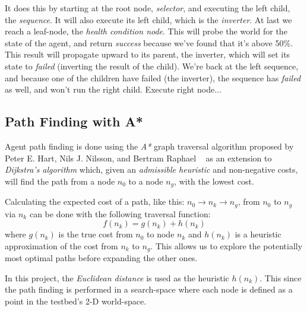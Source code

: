 \documentclass[a4paper, twocolumn]{article}
\begin{document}
        It does this by starting at the root node, \emph{selector}, and executing the left child, the \emph{sequence}. It will also execute its left child, which is the \emph{inverter}. At last we reach a leaf-node, the \emph{health condition node}. This will probe the world for the state of the agent, and return \emph{success} because we've found that it's above 50\%. This result will propagate upward to its parent, the inverter, which will set its state to \emph{failed} (inverting the result of the child). We're back at the left sequence, and because one of the children have failed (the inverter), the sequence has \emph{failed} as well, and won't run the right child. Execute right node...

        \subsection{Path Finding with A*} \label{sec:path_finding}

	Agent path finding is done using the \emph{A*} graph traversal algorithm proposed by Peter E. Hart, Nils J. Nilsson, and Bertram Raphael ~\cite{hart1968formal} as an extension to \emph{Dijkstra's algorithm} which, given an \emph{admissible heuristic} and non-negative costs, will find the path from a node \(n_0\) to a node \(n_g\), with the lowest cost.
	
    Calculating the expected cost of a path, like this: \(n_0 \rightarrow n_k \rightarrow n_g\), from \(n_0\) to \(n_g\) via \(n_k\) can be done with the following traversal function:
	\begin{equation*}
		f(n_k) = g(n_k) + h(n_k)
	\end{equation*}	
	where \(g(n_k)\) is the true cost from \(n_0\) to node \(n_k\) and \(h(n_k)\) is a heuristic approximation of the cost from \(n_k\) to \(n_g\). This allows us to explore the potentially most optimal paths before expanding the other ones.

        In this project, the \emph{Euclidean distance} is used as the heuristic \(h(n_k)\). This since the path finding is performed in a search-space where each node is defined as a point in the testbed's 2-D world-space.
\end{document}
